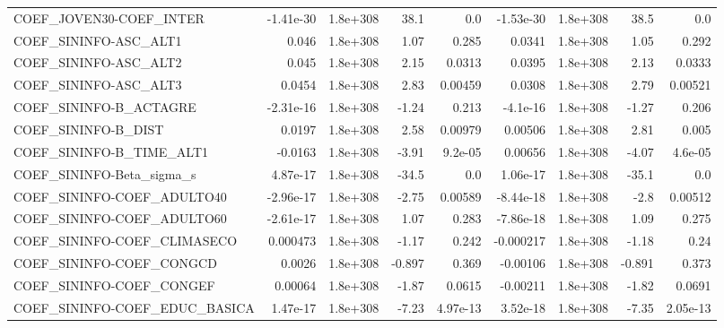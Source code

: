 \begin{tabular}{lrrrrrrrr}
COEF\_JOVEN30-COEF\_INTER           &   -1.41e-30 &     1.8e+308 &      38.1 &      0.0 &  -1.53e-30 &    1.8e+308 &         38.5 &           0.0 \\
COEF\_SININFO-ASC\_ALT1             &       0.046 &     1.8e+308 &      1.07 &    0.285 &     0.0341 &    1.8e+308 &         1.05 &         0.292 \\
COEF\_SININFO-ASC\_ALT2             &       0.045 &     1.8e+308 &      2.15 &   0.0313 &     0.0395 &    1.8e+308 &         2.13 &        0.0333 \\
COEF\_SININFO-ASC\_ALT3             &      0.0454 &     1.8e+308 &      2.83 &  0.00459 &     0.0308 &    1.8e+308 &         2.79 &       0.00521 \\
COEF\_SININFO-B\_ACTAGRE            &   -2.31e-16 &     1.8e+308 &     -1.24 &    0.213 &   -4.1e-16 &    1.8e+308 &        -1.27 &         0.206 \\
COEF\_SININFO-B\_DIST               &      0.0197 &     1.8e+308 &      2.58 &  0.00979 &    0.00506 &    1.8e+308 &         2.81 &         0.005 \\
COEF\_SININFO-B\_TIME\_ALT1          &     -0.0163 &     1.8e+308 &     -3.91 &  9.2e-05 &    0.00656 &    1.8e+308 &        -4.07 &       4.6e-05 \\
COEF\_SININFO-Beta\_sigma\_s         &    4.87e-17 &     1.8e+308 &     -34.5 &      0.0 &   1.06e-17 &    1.8e+308 &        -35.1 &           0.0 \\
COEF\_SININFO-COEF\_ADULTO40        &   -2.96e-17 &     1.8e+308 &     -2.75 &  0.00589 &  -8.44e-18 &    1.8e+308 &         -2.8 &       0.00512 \\
COEF\_SININFO-COEF\_ADULTO60        &   -2.61e-17 &     1.8e+308 &      1.07 &    0.283 &  -7.86e-18 &    1.8e+308 &         1.09 &         0.275 \\
COEF\_SININFO-COEF\_CLIMASECO       &    0.000473 &     1.8e+308 &     -1.17 &    0.242 &  -0.000217 &    1.8e+308 &        -1.18 &          0.24 \\
COEF\_SININFO-COEF\_CONGCD          &      0.0026 &     1.8e+308 &    -0.897 &    0.369 &   -0.00106 &    1.8e+308 &       -0.891 &         0.373 \\
COEF\_SININFO-COEF\_CONGEF          &     0.00064 &     1.8e+308 &     -1.87 &   0.0615 &   -0.00211 &    1.8e+308 &        -1.82 &        0.0691 \\
COEF\_SININFO-COEF\_EDUC\_BASICA     &    1.47e-17 &     1.8e+308 &     -7.23 & 4.97e-13 &   3.52e-18 &    1.8e+308 &        -7.35 &      2.05e-13 \\

\end{tabular}
